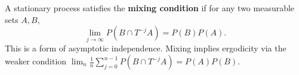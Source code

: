 A stationary process satisfies the \textbf{mixing condition} if for any two measurable sets $A, B$,
$$\lim_{j \to \infty} P(B \cap T^{-j}A) = P(B)P(A).$$
This is a form of asymptotic independence. Mixing implies ergodicity via the weaker condition $\lim_n \frac{1}{n} \sum_{j=0}^{n-1} P(B \cap T^{-j}A) = P(A)P(B)$.
